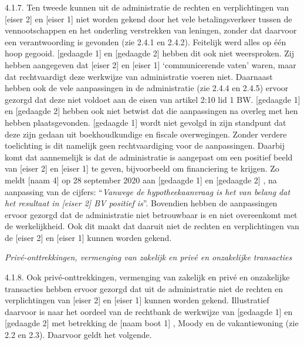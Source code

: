 \documentclass[
  dutch,
  a4paper,
]{article}
\begin{document}
4.1.7. Ten tweede kunnen uit de administratie de rechten en verplichtingen van {[}eiser 2{]} en {[}eiser 1{]} niet worden gekend door het vele betalingsverkeer tussen de vennootschappen en het onderling verstrekken van leningen, zonder dat daarvoor een verantwoording is gevonden (zie 2.4.1 en 2.4.2). Feitelijk werd alles op één hoop gegooid. {[}gedaagde 1{]} en {[}gedaagde 2{]} hebben dit ook niet weersproken. Zij hebben aangegeven dat {[}eiser 2{]} en {[}eiser 1{]} `communicerende vaten' waren, maar dat rechtvaardigt deze werkwijze van administratie voeren niet. Daarnaast hebben ook de vele aanpassingen in de administratie (zie 2.4.4 en 2.4.5) ervoor gezorgd dat deze niet voldoet aan de eisen van artikel 2:10 lid 1 BW. {[}gedaagde 1{]} en {[}gedaagde 2{]} hebben ook niet betwist dat die aanpassingen na overleg met hen hebben plaatsgevonden. {[}gedaagde 1{]} wordt niet gevolgd in zijn standpunt dat deze zijn gedaan uit boekhoudkundige en fiscale overwegingen. Zonder verdere toelichting is dit namelijk geen rechtvaardiging voor de aanpassingen. Daarbij komt dat aannemelijk is dat de administratie is aangepast om een positief beeld van {[}eiser 2{]} en {[}eiser 1{]} te geven, bijvoorbeeld om financiering te krijgen. Zo meldt {[}naam 4{]} op 28 september 2020 aan {[}gedaagde 1{]} en {[}gedaagde 2{]} , na aanpassing van de cijfers: ``\emph{Vanwege de hypotheekaanvraag is het van belang dat het resultaat in {[}eiser 2{]} BV positief is}''. Bovendien hebben de aanpassingen ervoor gezorgd dat de administratie niet betrouwbaar is en niet overeenkomt met de werkelijkheid. Ook dit maakt dat daaruit niet de rechten en verplichtingen van de {[}eiser 2{]} en {[}eiser 1{]} kunnen worden gekend.

\emph{Privé-onttrekkingen, vermenging van zakelijk en privé en onzakelijke transacties}

4.1.8. Ook privé-onttrekkingen, vermenging van zakelijk en privé en onzakelijke transacties hebben ervoor gezorgd dat uit de administratie niet de rechten en verplichtingen van {[}eiser 2{]} en {[}eiser 1{]} kunnen worden gekend. Illustratief daarvoor is naar het oordeel van de rechtbank de werkwijze van {[}gedaagde 1{]} en {[}gedaagde 2{]} met betrekking de {[}naam boot 1{]} , Moody en de vakantiewoning (zie 2.2 en 2.3). Daarvoor geldt het volgende.
\end{document}
